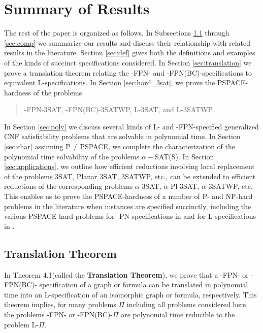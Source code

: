 \section{Summary of Results}
\label{sec:summary}

The rest of the paper is organized as follows.  In Subsections 
\ref{sec:trans} through \ref{sec:comp} 
we summarize our  results and discuss their relationship with related 
results in the literature. Section \ref{sec:def} gives both the 
definitions and examples of the kinds of  succinct 
specifications considered.
In Section \ref{sec:translation}
we  prove a translation theorem  relating the 
{-FPN-} and {-FPN(BC)-}specifications 
to equivalent {\sf L-}specifications. 
 In Section \ref{sec:hard_3sat},
we prove the {\sf PSPACE}-hardness of the problems
\begin{quote}
 {-FPN-3SAT}, {-FPN(BC)-3SATWP},  {\sf L-3SAT}, and
{\sf L-3SATWP}.
\end{quote}
In Section \ref{sec:poly} we discuss several kinds of  
{\sf L-} and {-FPN-}specified generalized {\sf CNF} 
 satisfiability problems that are solvable in 
polynomial time. In Section \ref{sec:char} assuming 
{\sf P}$\neq${\sf PSPACE}, we complete the 
characterization of the polynomial time solvability
of the problems $\alpha-${\sf SAT(S)}. 
In  Section \ref{sec:applications}, 
we outline how efficient reductions involving local replacement \cite{GJ79}
of the problems {\sf 3SAT, Planar 3SAT, 3SATWP,} etc., can be extended 
 to efficient reductions of the corresponding problems 
$\alpha$-{\sf 3SAT}, $\alpha$-{\sf Pl-3SAT}, $\alpha$-{\sf 3SATWP}, etc. 
This enables us to prove  the {\sf PSPACE-}hardness of a number of 
{\sf P-} and {\sf NP-}hard problems in the literature when instances are
specified succinctly, including the various {\sf PSPACE-}hard problems 
for {-PN-}specifications in \cite{Or82a} and for {\sf L-}specifications
in \cite{LW92}. 

 

\subsection{Translation Theorem}\label{sec:trans}
In Theorem 4.1(called the {\bf Translation Theorem}),
we prove that a {-FPN-} or {-FPN(BC)-} specification of a graph
or  formula can be translated in polynomial time into an
{\sf L}-specification of an isomorphic  graph or formula, respectively.
This theorem implies, for many problems
$\Pi$ including all problems considered here,  the problems 
{-FPN-} or {-FPN(BC)-}$\Pi$ are 
polynomial time reducible to  the problem {\sf L-}$\Pi$.

